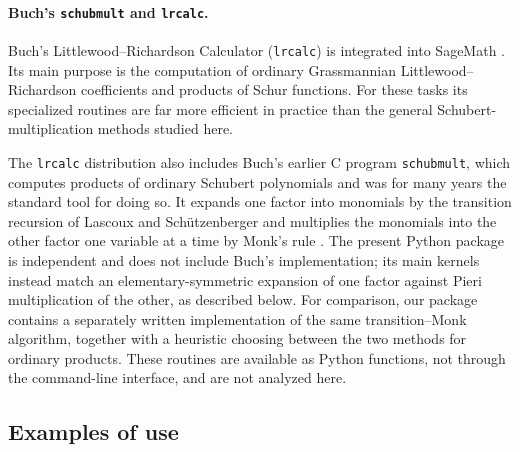 \documentclass{amsart}
\theoremstyle{definition}
\theoremstyle{remark}
\numberwithin{equation}{section}
\begin{document}
\paragraph{Buch's \texttt{schubmult} and \texttt{lrcalc}.}
Buch's Littlewood--Richardson Calculator (\texttt{lrcalc}) \cite{lrcalc}
is integrated into SageMath \cite{sagemath}. Its main purpose is the
computation of ordinary Grassmannian Littlewood--Richardson coefficients
and products of Schur functions. For these tasks its specialized
routines are far more efficient in practice than the general
Schubert-multiplication methods studied here.

The \texttt{lrcalc} distribution also includes Buch's earlier C program
\texttt{schubmult}, which computes products of ordinary Schubert
polynomials and was for many years the standard tool for doing so.
It expands one factor into monomials by the transition recursion of
Lascoux and Sch\"utzenberger \cite{lasschubschur} and multiplies the
monomials into the other factor one variable at a time by Monk's rule
\cite{monk}.
The present Python package is independent and does not include Buch's
implementation; its main kernels instead match an elementary-symmetric
expansion of one factor against Pieri multiplication of the other, as
described below.
For comparison, our package contains a separately written implementation
of the same transition--Monk algorithm, together with a heuristic
choosing between the two methods for ordinary products.
These routines are available as Python functions, not through the
command-line interface, and are not analyzed here.

\subsection{Examples of use}\label{sec:examples}
\end{document}
